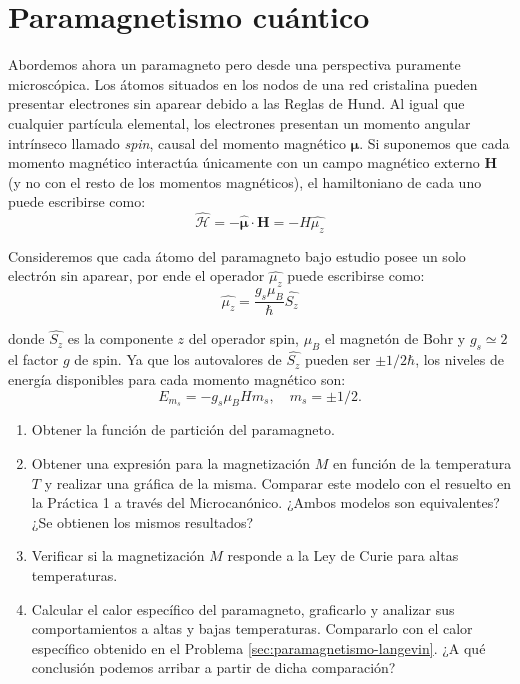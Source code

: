 \documentclass[a4paper,11pt]{article}
\begin{document}
\section{Paramagnetismo cuántico}
\label{sec:paramagnetismo-cuantico}

Abordemos ahora un paramagneto pero desde una perspectiva puramente 
microscópica. Los átomos situados en los nodos de una red cristalina pueden 
presentar electrones sin aparear debido a las Reglas de Hund. Al igual que 
cualquier partícula elemental, los electrones presentan un momento angular 
intrínseco llamado \emph{spin}, causal del momento magnético 
$\boldsymbol{\mu}$.
Si suponemos que cada momento magnético interactúa únicamente con un 
campo magnético externo $\textbf{H}$ (y no con el resto de los momentos 
magnéticos), el hamiltoniano de cada uno puede escribirse como:
$$ \hat{\mathcal{H}} = 
- \hat{\boldsymbol{\mu}} \cdot \textbf{H} = - H \hat{\mu_z} $$

Consideremos que cada átomo del paramagneto bajo estudio posee un solo 
electrón sin aparear, por ende el operador $\hat{\mu_z}$ puede 
escribirse como:
$$ \hat{\mu_z} = \frac{g_s \mu_B}{\hbar} \hat{S_z} $$

donde $\hat{S_z}$ es la componente $z$ del operador spin, $\mu_B$ el 
magnetón de Bohr y $g_s \simeq 2$ el factor $g$ de spin. Ya que los 
autovalores de $\hat{S_z}$ pueden ser $\pm 1/2 \hbar$, los niveles de 
energía disponibles para cada momento magnético son: $$ E_{m_s} = - g_s 
\mu_B H m_s, \quad  m_s = \pm 1/2 .$$

\begin{enumerate}[label=(\alph*),
                  leftmargin=2\parindent,
                  rightmargin=2\parindent]

    \item{Obtener la función de partición del paramagneto.}

    \item{Obtener una expresión para la magnetización $M$ en función 
          de la temperatura $T$ y realizar una gráfica de la misma.
          Comparar este modelo con el resuelto en la Práctica 1 a 
          través del Microcanónico.
          ¿Ambos modelos son equivalentes?
          ¿Se obtienen los mismos resultados?}
    
    \item{Verificar si la magnetización $M$ responde a la Ley de Curie 
          para altas temperaturas.}

    \item{Calcular el calor específico del paramagneto, graficarlo y 
          analizar sus comportamientos a altas y bajas temperaturas. 
          Compararlo con el calor específico obtenido en el Problema 
          \ref{sec:paramagnetismo-langevin}.
          ¿A qué conclusión podemos arribar a partir de dicha 
          comparación?
          }

\end{enumerate}
\end{document}
